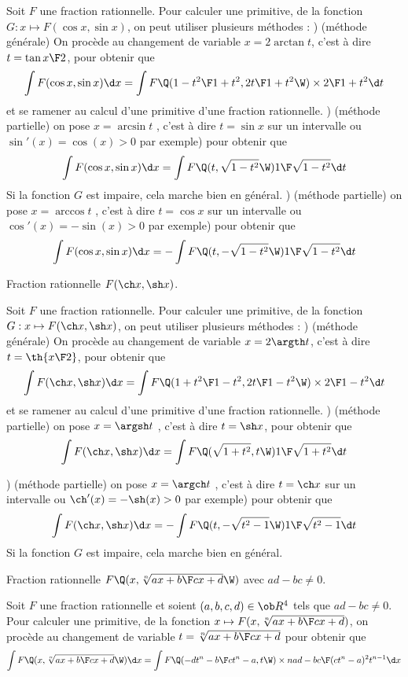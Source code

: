 \Propriete []  Soit $F$ une fraction rationnelle. Pour calculer une primitive, de la fonction $G:x\mapsto F(\cos x,\sin x)$, on peut utiliser plusieurs méthodes : ) (méthode générale) On procède au changement de variable $x=2\arctan t$, \pn c'est à dire $t=\tan{x\F2}$, pour obtenir que 
$$
\int F(\cos x,\sin x)\d x=\int F\Q({1-t^2\F1+t^2},{2t\F 1+t^2}\W)\times{2\F1+t^2}\d t
$$
et se ramener au calcul d'une primitive d'une fraction rationnelle. 
\medskip
{}) (méthode partielle) on pose $x=\arcsin t$ , c'est à dire $t=\sin x$ sur un intervalle ou $\sin'(x)=\cos(x)>0$ par exemple) pour obtenir que 
$$
\int F(\cos x,\sin x)\d x=\int F\Q(t,\sqrt{1-t^2}\W){1\F\sqrt{1-t^2}}\d t
$$
Si la fonction $G$ est impaire, cela marche bien en général. 
\medskip
{}) (méthode partielle) on pose $x=\arccos t$ , c'est à dire $t=\cos x$ sur un intervalle ou $\cos'(x)=-\sin(x)> 0$ par exemple) pour obtenir que 
$$
\int F(\cos x,\sin x)\d x=-\int F\Q(t,-\sqrt{1-t^2}\W){1\F\sqrt{1-t^2}}\d t
$$


\Concept [Index=Primitives!des fonctions du type@des fonctions du type $F(\ch x,\sh x)$] Fraction rationnelle $F(\ch x,\sh x)$. 

\Propriete []  Soit $F$ une fraction rationnelle. Pour calculer une primitive, de la fonction $G:x\mapsto F(\ch x,\sh x)$, on peut utiliser plusieurs méthodes : ) (méthode générale) On procède au changement de variable $x=2\argth t$, c'est à dire $t=\th{x\F2}$, pour obtenir que 
$$
\int F(\ch x,\sh x)\d x=\int F\Q({1+t^2\F1-t^2},{2t\F 1-t^2}\W)\times{2\F1-t^2}\d t
$$
et se ramener au calcul d'une primitive d'une fraction rationnelle. 
\medskip
{}) (méthode partielle) on pose $x=\argsh t$ , c'est à dire $t=\sh x$, pour obtenir que 
$$
\int F(\ch x,\sh x)\d x=\int F\Q(\sqrt{1+t^2},t\W){1\F\sqrt{1+t^2}}\d t
$$

\medskip
{}) (méthode partielle) on pose $x=\argch t$ , c'est à dire $t=\ch x$ sur un intervalle ou $\ch'(x)=-\sh(x)> 0$ par exemple) pour obtenir que 
$$
\int F(\ch x,\sh x)\d x=-\int F\Q(t,-\sqrt{t^2-1}\W){1\F\sqrt{t^2-1}}\d t
$$
Si la fonction $G$ est impaire, cela marche bien en général. 



\Concept [Index=Primitives!des fonctions du type@des fonctions du type $F\Q(x,\root n\of{ax+b \F cx+d}\W)$] Fraction rationnelle $F\Q(x,\root n\of{ax+b \F cx+d}\W)$ avec $ad-bc\neq0$. 

\Propriete []  Soit $F$ une fraction rationnelle et soient $(a,b,c,d)\in\ob R^4$ tels que $ad-bc\neq0$. 
Pour calculer une primitive, de la fonction $x\mapsto F(x, \root n\of{ax+b \F cx+d})$, on procède au changement de variable 
$t=\root n\of{ax+b \F cx+d}$ pour obtenir que 
$$
\int F\Q(x, \root n\of{ax+b \F cx+d}\W)\d x=\int F\Q(-{dt^n-b\F ct^n-a}, t\W)\times n{ad-bc\F(ct^n-a)^2}t^{n-1}\d x
$$


